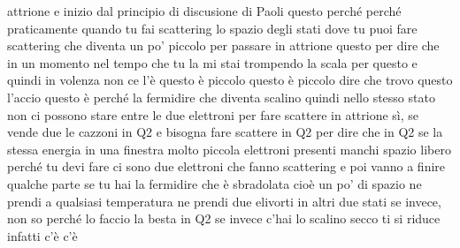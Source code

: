 attrione e inizio dal principio di discusione di Paoli questo perché perché praticamente quando tu fai scattering lo spazio degli stati dove tu puoi fare scattering che diventa un po' piccolo per passare in attrione questo per dire che in un momento nel tempo che tu la mi stai trompendo la scala per questo e quindi in volenza non ce l'è questo è piccolo questo è piccolo dire che trovo questo l'accio questo è perché la fermidire che diventa scalino quindi nello stesso stato non ci possono stare entre le due elettroni per fare scattere in attrione sì, se vende due le cazzoni in Q2 e bisogna fare scattere in Q2 per dire che in Q2 se la stessa energia in una finestra molto piccola elettroni presenti manchi spazio libero perché tu devi fare ci sono due elettroni che fanno scattering e poi vanno a finire qualche parte se tu hai la fermidire che è sbradolata cioè un po' di spazio ne prendi a qualsiasi temperatura ne prendi due elivorti in altri due stati se invece, non so perché lo faccio la besta in Q2 se invece c'hai lo scalino secco ti si riduce infatti c'è c'è 


